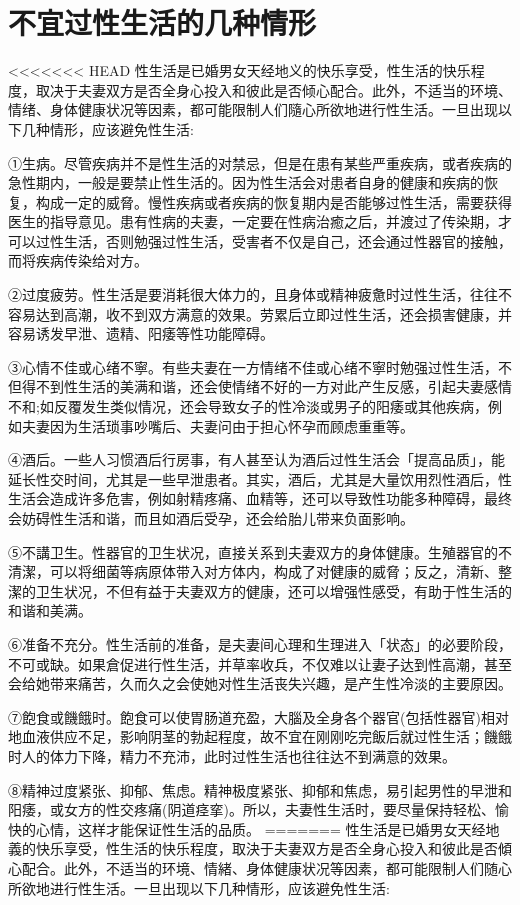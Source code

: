 \documentclass[12pt,UTF8]{ctexbook}
\begin{document}
\section{不宜过性生活的几种情形}

<<<<<<< HEAD
性生活是已婚男女天经地义的快乐享受，性生活的快乐程度，取决于夫妻双方是否全身心投入和彼此是否倾心配合。此外，不适当的环境、情绪、身体健康状况等因素，都可能限制人们隨心所欲地进行性生活。一旦出现以下几种情形，应该避免性生活:

①生病。尽管疾病并不是性生活的对禁忌，但是在患有某些严重疾病，或者疾病的急性期内，一般是要禁止性生活的。因为性生活会对患者自身的健康和疾病的恢复，构成一定的威脅。慢性疾病或者疾病的恢复期内是否能够过性生活，需要获得医生的指导意见。患有性病的夫妻，一定要在性病治癒之后，并渡过了传染期，才可以过性生活，否则勉强过性生活，受害者不仅是自己，还会通过性器官的接触，而将疾病传染给对方。

②过度疲劳。性生活是要消耗很大体力的，且身体或精神疲惫时过性生活，往往不容易达到高潮，收不到双方满意的效果。劳累后立即过性生活，还会损害健康，并容易诱发早泄、遗精、阳痿等性功能障碍。

③心情不佳或心绪不寧。有些夫妻在一方情绪不佳或心绪不寧时勉强过性生活，不但得不到性生活的美满和谐，还会使情绪不好的一方对此产生反感，引起夫妻感情不和;如反覆发生类似情况，还会导致女子的性冷淡或男子的阳痿或其他疾病，例如夫妻因为生活琐事吵嘴后、夫妻问由于担心怀孕而顾虑重重等。

④酒后。一些人习惯酒后行房事，有人甚至认为酒后过性生活会「提高品质」，能延长性交时间，尤其是一些早泄患者。其实，酒后，尤其是大量饮用烈性酒后，性生活会造成许多危害，例如射精疼痛、血精等，还可以导致性功能多种障碍，最终会妨碍性生活和谐，而且如酒后受孕，还会给胎儿带来负面影响。

⑤不講卫生。性器官的卫生状况，直接关系到夫妻双方的身体健康。生殖器官的不清潔，可以将细菌等病原体带入对方体内，构成了对健康的威脅；反之，清新、整潔的卫生状况，不但有益于夫妻双方的健康，还可以增强性感受，有助于性生活的和谐和美满。

⑥准备不充分。性生活前的准备，是夫妻间心理和生理进入「状态」的必要阶段，不可或缺。如果倉促进行性生活，并草率收兵，不仅难以让妻子达到性高潮，甚至会给她带来痛苦，久而久之会使她对性生活丧失兴趣，是产生性冷淡的主要原因。

⑦飽食或饑餓时。飽食可以使胃肠道充盈，大腦及全身各个器官(包括性器官)相对地血液供应不足，影响阴茎的勃起程度，故不宜在刚刚吃完飯后就过性生活；饑餓时人的体力下降，精力不充沛，此时过性生活也往往达不到满意的效果。

⑧精神过度紧张、抑郁、焦虑。精神极度紧张、抑郁和焦虑，易引起男性的早泄和阳痿，或女方的性交疼痛(阴道痉挛)。所以，夫妻性生活时，要尽量保持轻松、愉快的心情，这样才能保证性生活的品质。
=======
性生活是已婚男女天经地義的快乐享受，性生活的快乐程度，取決于夫妻双方是否全身心投入和彼此是否傾心配合。此外，不适当的环境、情緒、身体健康状况等因素，都可能限制人们随心所欲地进行性生活。一旦出现以下几种情形，应该避免性生活:
\end{document}
